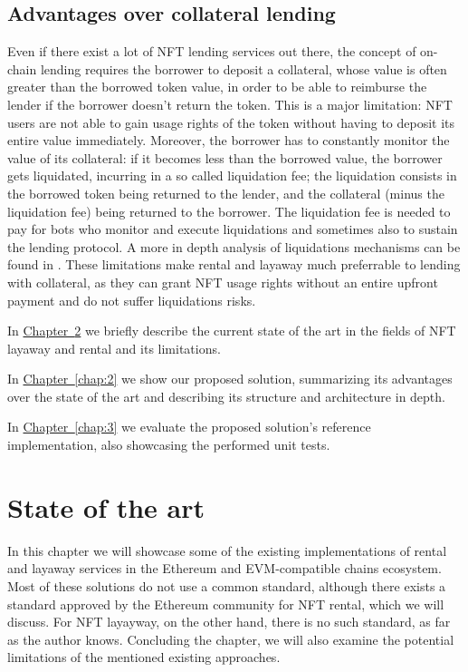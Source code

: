 \documentclass[english, LaM, oneside]{sapthesis}%
\begin{document}
\section{Advantages over collateral lending}
Even if there exist a lot of NFT lending services out there, the concept of on-chain lending requires the borrower to deposit a collateral, whose value is often greater than the borrowed token value, in order to be able to reimburse the lender if the borrower doesn't return the token. This is a major limitation: NFT users are not able to gain usage rights of the token without having to deposit its entire value immediately. Moreover, the borrower has to constantly monitor the value of its collateral: if it becomes less than the borrowed value, the borrower gets liquidated, incurring in a so called liquidation fee; the liquidation consists in the borrowed token being returned to the lender, and the collateral (minus the liquidation fee) being returned to the borrower. The liquidation fee is needed to pay for bots who monitor and execute liquidations and sometimes also to sustain the lending protocol. A more in depth analysis of liquidations mechanisms can be found in \cite{ref:liquidation}.\newline
These limitations make rental and layaway much preferrable to lending with collateral, as they can grant NFT usage rights without an entire upfront payment and do not suffer liquidations risks. 

\bigskip
\bigskip
\bigskip
\bigskip
In \hyperref[chap:1]{Chapter~\ref*{chap:1}} we briefly describe the current state of the art in the fields of NFT layaway and rental and its limitations.

\bigskip
In \hyperref[chap:2]{Chapter~\ref*{chap:2}} we show our proposed solution, summarizing its advantages over the state of the art and describing its structure and architecture in depth.

\bigskip
In \hyperref[chap:3]{Chapter~\ref*{chap:3}} we evaluate the proposed solution's reference implementation, also showcasing the performed unit tests.

\chapter{State of the art}
\label{chap:1}
In this chapter we will showcase some of the existing implementations of rental and layaway services in the Ethereum and EVM-compatible chains ecosystem. Most of these solutions do not use a common standard, although there exists a standard approved by the Ethereum community for NFT rental, which we will discuss. For NFT layayway, on the other hand, there is no such standard, as far as the author knows.\newline
Concluding the chapter, we will also examine the potential limitations of the mentioned existing approaches.
\end{document}

